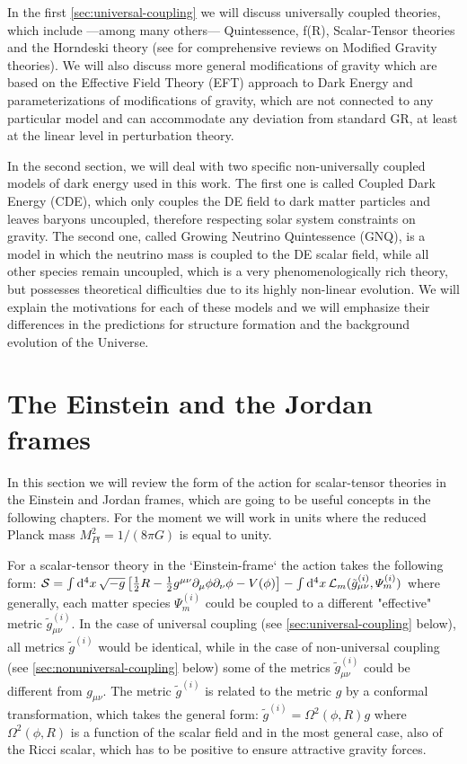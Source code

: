 In the first \cref{sec:universal-coupling} we will discuss universally coupled theories, which include ---among many others--- Quintessence, f(R),
Scalar-Tensor theories and the Horndeski theory 
(see \cite{Luca, Cliffton, Silvestri, Joyce, and more} for comprehensive reviews on Modified Gravity theories). 
We will also discuss
more general modifications of gravity which are based on the Effective Field Theory (EFT) approach to
Dark Energy and parameterizations of modifications of gravity, which
are not connected to any particular model and can accommodate any deviation from standard GR, at least at the linear 
level in perturbation theory.

In the second section, we will deal with two specific non-universally coupled models of dark energy used in this work. 
The first one is
called Coupled Dark Energy (CDE), which only couples the DE field to dark matter particles and leaves baryons uncoupled, therefore respecting solar system
constraints on gravity.
The second one, called Growing Neutrino Quintessence (GNQ), is a model in which the neutrino mass is coupled to the DE scalar field, while 
all other species remain uncoupled, which is a very phenomenologically rich theory, but possesses theoretical difficulties due to its highly non-linear evolution.
We will explain the motivations for each of these models and we will emphasize their differences in the predictions for structure formation and the background evolution of the Universe.
 
\section{The Einstein and the Jordan frames}

In this section we will review the form of the action for scalar-tensor theories in the Einstein and Jordan frames,
which are going to be useful concepts in the following chapters. For the moment we will work in units where the reduced Planck mass
$M_{Pl}^{2} = 1/(8 \pi G)$ is equal to unity.

For a scalar-tensor theory in the `Einstein-frame` the action takes the following form:
\beeqc$\label{eq:einstein-frame-action}
\mathcal{S} = \int \mathrm{d}^{4} {x} \, \sqrt{-g} \left[  \frac{1}{2} R - \frac{1}{2} g^{\mu \nu}  \partial_{\mu}\phi \partial_{\nu}\phi 
- V(\phi)    \right] - \int \mathrm{d}^{4} {x} \, \mathcal{L}_m (\tilde{g}^{(i)}_{\mu \nu} , \varPsi_m^{(i)} )
$
where generally, each matter species $\varPsi_m^{(i)}$ could be coupled to a different "effective" metric $\tilde{g}^{(i)}_{\mu \nu}$.
In the case of universal coupling (see \cref{sec:universal-coupling} below), all metrics $\tilde{g}^{(i)}$ would be identical, 
while in the case of non-universal coupling (see \cref{sec:nonuniversal-coupling} below) some of the metrics $\tilde{g}^{(i)}_{\mu \nu}$ could
be different from $g_{\mu \nu}$.
The metric $\tilde{g}^{(i)}$ is related to the metric $g$ by a conformal transformation, which takes the general form:
\beeqc$
\tilde{g}^{(i)} = \Omega^2(\phi, R) g
$
where $\Omega^2(\phi, R)$ is a function of the scalar field and in the most general case, also of the Ricci scalar, which has to be positive
to ensure attractive gravity forces.

